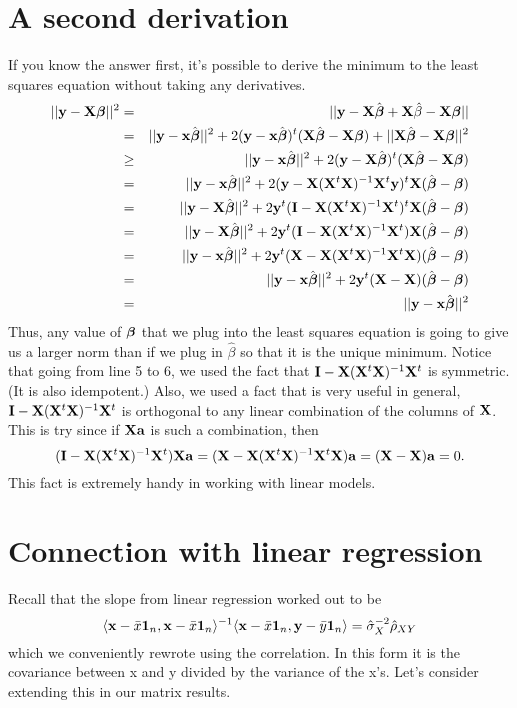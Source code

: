 \section{A second derivation}
If you know the answer first, it's possible to derive the 
minimum to the least squares equation without taking any derivatives.
\begin{eqnarray*}
|| \by - \bX \bbeta ||^2 &=& || \by - \bX \hat \bbeta + \bX\hat \beta - \bX \bbeta || \\
& = & ||\by - \bx \hat \bbeta||^2
+ 2 (\by - \bx \hat \bbeta)^t (\bX \hat \bbeta - \bX \bbeta)
+ ||\bX \hat \bbeta - \bX \bbeta||^2 \\
& \geq & ||\by - \bx \hat \bbeta||^2
+ 2 (\by - \bX \hat \bbeta)^t (\bX \hat \bbeta - \bX \bbeta) \\
& = & ||\by - \bx \hat \bbeta||^2
+ 2 (\by - \yhat)^t \bX (\hat \bbeta - \bbeta) \\
& = & ||\by - \bX \hat \bbeta||^2
+ 2 \by^t(\bI - \hatmat )^t \bX (\hat \bbeta - \bbeta) \\
& = & ||\by - \bX \hat \bbeta||^2
+ 2 \by^t(\bI - \hatmat ) \bX (\hat \bbeta - \bbeta) \\
& = & ||\by - \bx \hat \bbeta||^2
+ 2 \by^t(\bX - \hatmat \bX )(\hat \bbeta - \bbeta) \\
& = & ||\by - \bx \hat \bbeta||^2
+ 2 \by^t(\bX - \bX )(\hat \bbeta - \bbeta) \\
& = & ||\by - \bx \hat \bbeta||^2
\end{eqnarray*}
Thus, any value of $\bbeta$ that we plug into the least squares equation
is going to give us a larger norm than if we plug in $\hat \beta$ so that
it is the unique minimum.
Notice that going from line 5 to 6, we used the fact that $\bI - \hatmat$ is symmetric. (It is also idempotent.) Also, we used a fact that is very
useful in general, $\bI - \hatmat$ is orthogonal to any linear combination
of the columns of $\bX$. This is try since if $\bX \ba$ is such a combination,
then
$$
(\bI - \hatmat)\bX \ba = (\bX - \hatmat \bX)\ba = (\bX - \bX) \ba = 0.
$$
This fact is extremely handy in working with linear models. 

\section{Connection with linear regression}
\label{sec:lslin}
Recall that the slope from linear regression worked out to be
$$
\ip{\bx - \bar x \bone_n}{\bx - \bar x \bone_n}^{-1}\ip{\bx - \bar x\bone_n}{\by - \bar y \bone_n} 
= \hat \sigma^{-2}_{X} \hat \rho_{XY}
$$
which we conveniently rewrote using the correlation. In this form it is the
covariance between x and y divided by the variance of the x's. Let's consider
extending this in our matrix results.

